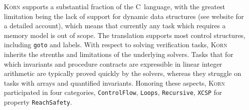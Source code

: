 \documentclass{llncs}
\newcommand{\Korn}{\textsc{Korn}\xspace}
\begin{document}
\Korn supports a substantial fraction of the C~language, with the greatest limitation
being the lack of support for dynamic data structures (see website for a detailed account),
which means that currently any task which requires a memory model is out of scope.
The translation supports most control structures, including \texttt{goto} and labels.
With respect to solving verification tasks,
\Korn inherits the strenths and limitations of the underlying solvers.
Tasks that for which invariants and procedure contracts are expressible in linear integer arithmetic
are typically proved quickly by the solvers,
whereas they struggle on tasks with arrays and quantified invariants.
Honoring these aspects, \Korn participated in four categories,
\texttt{ControlFlow},
\texttt{Loops},
\texttt{Recursive},
\texttt{XCSP}
for property \texttt{ReachSafety}.
\end{document}
